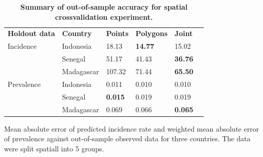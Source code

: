 \documentclass[10pt,letterpaper]{article}
\newlength\savedwidth
\newcommand\thickhline{\noalign{\global\savedwidth\arrayrulewidth\global\arrayrulewidth 2pt}%
\hline
\noalign{\global\arrayrulewidth\savedwidth}}
\begin{document}
\begin{table}[!ht]
\begin{adjustwidth}{-2.25in}{0in} %
\centering
\caption{
{\bf Summary of out-of-sample accuracy for spatial crossvalidation experiment.}}
\begin{tabular}{llllll}
\hline
{\bf Holdout data} & {\bf Country} &  {\bf Points} & {\bf Polygons} & {\bf Joint} \\
\thickhline 
Incidence & Indonesia &  18.13 &  {\bf 14.77} &   15.02\\
& Senegal &  51.17 &  41.43 &   {\bf 36.76}\\
& Madagascar & 107.32 &  71.44 &   {\bf 65.50}\vspace{3mm}\\
Prevalence & Indonesia & 0.011 & 0.010 &  0.010\\
& Senegal & {\bf 0.015} & 0.019 &  0.019\\
& Madagascar & 0.069 & 0.066 &  {\bf 0.065}\\
\end{tabular}
\begin{flushleft}
Mean absolute error of predicted incidence rate and weighted mean absolute error of prevalence against out-of-sample observed data for three countries.
The data were split spatiall into 5 groups.
\end{flushleft}
\label{table2}
\end{adjustwidth}
\end{table}
\end{document}

